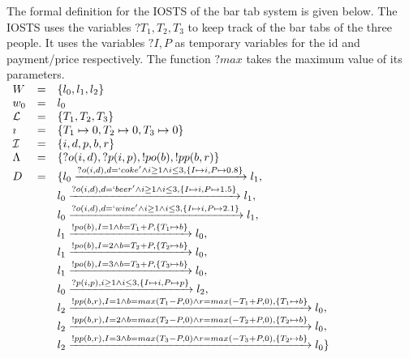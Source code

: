 The formal definition for the IOSTS of the bar tab system is given below. The IOSTS uses the variables $?T_1, T_2, T_3$ to keep track of the bar tabs of the three people. It uses the variables $?I, P$ as temporary variables for the id and payment/price respectively. The function $?max$ takes the maximum value of its parameters.
\vspace{5px} \\
$\begin{array}{lcl}
W & = & \{l_0, l_1, l_2\} \\
w_0 & = & l_0 \\
\mathcal{L} & = & \{T_1, T_2, T_3\} \\
\imath & = & \{T_1 \mapsto 0, T_2 \mapsto 0, T_3 \mapsto 0\} \\
\mathcal{I} & = & \{i, d, p, b, r\} \\
\Lambda & = & \{?o(i,d), ?p(i,p), !po(b), !pp(b, r)\} \\
D & = & \{l_0\xrightarrow{?o(i,d), d=`coke' \land i \geq 1 \land i \leq 3, \{I \mapsto i, P \mapsto 0.8\}}l_1, \\
& & l_0\xrightarrow{?o(i,d), d=`beer' \land i \geq 1 \land i \leq 3, \{I \mapsto i, P \mapsto 1.5\}}l_1,\\
& & l_0\xrightarrow{?o(i,d), d=`wine' \land i \geq 1 \land i \leq 3, \{I \mapsto i, P \mapsto 2.1\}}l_1,\\
& & l_1\xrightarrow{!po(b), I=1\land b=T_1+P, \{T_1 \mapsto b\}}l_0,\\
& & l_1\xrightarrow{!po(b), I=2\land b=T_2+P, \{T_2 \mapsto b\}}l_0,\\
& & l_1\xrightarrow{!po(b), I=3\land b=T_3+P, \{T_3 \mapsto b\}}l_0,\\
& & l_0\xrightarrow{?p(i,p), i \geq 1 \land i \leq 3, \{I \mapsto i, P \mapsto p\}}l_2,\\
& & l_2\xrightarrow{!pp(b,r),I=1\land b=max(T_1-P, 0)\land r=max(-T_1+P,0),\{T_1 \mapsto b\}}l_0,\\
& & l_2\xrightarrow{!pp(b,r),I=2\land b=max(T_2-P, 0)\land r=max(-T_2+P,0),\{T_2 \mapsto b\}}l_0, \\
& & l_2\xrightarrow{!pp(b,r),I=3\land b=max(T_3-P, 0)\land r=max(-T_3+P,0),\{T_2 \mapsto b\}}l_0\}
\end{array}$

